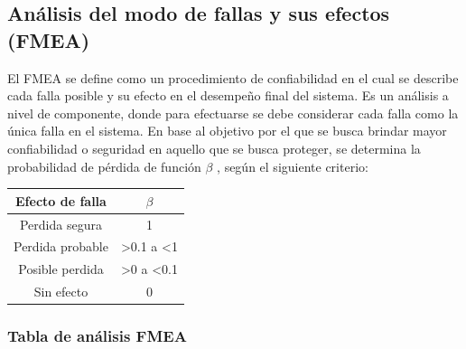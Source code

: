 \documentclass{article}
\begin{document}
\subsection{Análisis del modo de fallas y sus efectos (FMEA)}
El FMEA se define como un procedimiento de confiabilidad en el cual se describe cada falla posible y su efecto en el desempeño final del sistema. Es un análisis a nivel de componente, donde para efectuarse se debe considerar cada falla como la única falla en el sistema. En base al objetivo por el que se busca brindar mayor confiabilidad o seguridad en aquello que se busca proteger, se determina la probabilidad de pérdida de función $\beta$ , según el siguiente criterio:

\begin{table}[h!]
\centering
\begin{tabular}{@{}c|c@{}}
\toprule
\multicolumn{1}{|c|}{Efecto de falla} & \multicolumn{1}{c|}{$\beta$} \\ \midrule
Perdida segura & 1 \\ \midrule
Perdida probable & \textgreater{}0.1 a \textless{}1 \\ \midrule
Posible perdida & \textgreater{}0 a \textless{}0.1 \\ \midrule
Sin efecto & 0 \\ \bottomrule
\end{tabular}
\end{table}

\subsubsection{Tabla de análisis FMEA}
\end{document}
